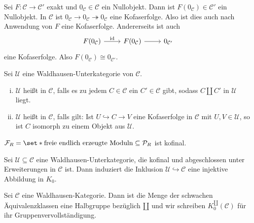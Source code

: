 \begin{bemerkung}
	Sei $F \colon \mathcal{C} \to \mathcal{C}'$ exakt und $0_{\mathcal{C}} \in \mathcal{C}$ ein Nullobjekt.
	Dann ist $F(0_{\mathcal{C}}) \in \mathcal{C}'$ ein Nullobjekt.
	In $\mathcal{C}$ ist $0_{\mathcal{C}} \to 0_{\mathcal{C}} \twoheadrightarrow 0_\mathcal{C}$ eine Kofaserfolge.
	Also ist dies auch nach Anwendung von $F$ eine Kofaserfolge.
	Andererseits ist auch
	\[
		\begin{tikzcd}
			F(0_{\mathcal{C}}) \rar["\id"] & F(0_{\mathcal{C}}) \rar & 0_{\mathcal{C}'}
		\end{tikzcd}
	\]
	eine Kofaserfolge. 
	Also $F(0_{\mathcal{C}}) \cong 0_{\mathcal{C}'}$.
\end{bemerkung}

\begin{definition}
	Sei $\mathcal{U}$ eine Waldhausen-Unterkategorie von $\mathcal{C}$.
	\begin{enumerate}[(i)]
		\item $\mathcal{U}$ heißt  in $\mathcal{C}$, falls es zu jedem $C \in \mathcal{C}$ ein $C' \in \mathcal{C}$ gibt, sodass $C \amalg C'$ in $\mathcal{U}$ liegt.
		\item $\mathcal{U}$ heißt  in $\mathcal{C}$, falls gilt: Ist $U \hookrightarrow C \to V$ eine Kofaserfolge in $\mathcal{C}$ mit $U,V \in \mathcal{U}$, so ist $C$ isomorph zu einem Objekt aus $\mathcal{U}$.
	\end{enumerate}
\end{definition}

\begin{beispiel}
	$\mathcal{F}_R = \set*{\text{freie endlich erzeugte Moduln}} \subseteq \mathcal{P}_R$ ist kofinal.
\end{beispiel}

\begin{satz}[name={{Kofinalitätssatz für $K_0$}}]
	Sei $\mathcal{U} \subseteq \mathcal{C}$ eine Waldhausen-Unterkategorie, die kofinal und abgeschlossen unter Erweiterungen in $\mathcal{C}$ ist.
	Dann induziert die Inklusion $\mathcal{U}\hookrightarrow \mathcal{C}$ eine injektive Abbildung in $K_0$.
\end{satz}

\begin{bemerkung}
	Sei $\mathcal{C}$ eine Waldhausen-Kategorie.
	Dann ist die Menge der schwachen Äquivalenzklassen eine Halbgruppe bezüglich $\amalg$ und wir schreiben $K^\amalg_0(\mathcal{C})$ für ihr Gruppenvervollständigung.
\end{bemerkung}


